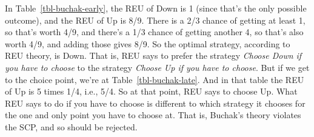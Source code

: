 \documentclass[
  10pt,
  letterpaper,
  DIV=11,
  numbers=noendperiod,
  twoside]{scrartcl}
\begin{document}
\begin{table}

\caption{\label{tbl-panel}Two strategy tables for
Figure~\ref{fig-buchak}.}

\begin{minipage}{0.50\linewidth}



\end{minipage}%
%
\begin{minipage}{0.50\linewidth}



\end{minipage}%

\end{table}%

In Table~\ref{tbl-buchak-early}, the REU of Down is 1 (since that's the
only possible outcome), and the REU of Up is 8/9. There is a 2/3 chance
of getting at least 1, so that's worth 4/9, and there's a 1/3 chance of
getting another 4, so that's also worth 4/9, and adding those gives 8/9.
So the optimal strategy, according to REU theory, is Down. That is, REU
says to prefer the strategy \emph{Choose Down if you have to choose} to
the strategy \emph{Choose Up if you have to choose}. But if we get to
the choice point, we're at Table~\ref{tbl-buchak-late}. And in that
table the REU of Up is 5 times 1/4, i.e., 5/4. So at that point, REU
says to choose Up. What REU says to do if you have to choose is
different to which strategy it chooses for the one and only point you
have to choose at. That is, Buchak's theory violates the SCP, and so
should be rejected.
\end{document}
